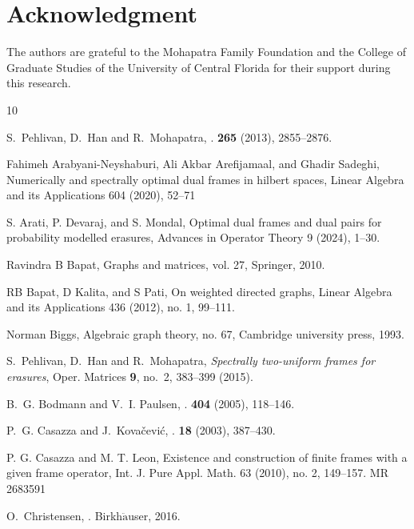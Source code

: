 \documentclass[final,1p,times]{elsarticle}
\begin{document}
\section{Acknowledgment}
	 The authors are grateful to the Mohapatra Family Foundation and the College of Graduate Studies of the University of Central Florida for their support during this research.
	



\begin{thebibliography}{10}

S.~Pehlivan, D.~Han and R.~Mohapatra,
.
 \textbf{265} (2013), 2855--2876.

Fahimeh Arabyani-Neyshaburi, Ali Akbar Arefijamaal, and Ghadir Sadeghi, Numerically and spectrally optimal
dual frames in hilbert spaces, Linear Algebra and its Applications 604 (2020), 52–71

S. Arati, P. Devaraj, and S. Mondal, Optimal dual frames and dual pairs for probability modelled erasures,
Advances in Operator Theory 9 (2024), 1–30.

Ravindra B Bapat, Graphs and matrices, vol. 27, Springer, 2010.

RB Bapat, D Kalita, and S Pati, On weighted directed graphs, Linear Algebra and its Applications 436 (2012), no. 1, 99–111.


Norman Biggs, Algebraic graph theory, no. 67, Cambridge university press, 1993.

S.~Pehlivan, D.~Han and R.~Mohapatra, \emph{Spectrally two-uniform
  frames for erasures}, Oper. Matrices \textbf{9}, no.~2, 383--399 (2015).


B.~G. Bodmann and V.~I. Paulsen,
.
 \textbf{404} (2005), 118--146.

P.~G. Casazza and J.~Kova{\v{c}}evi{\'c},
.
 \textbf{18} (2003), 387--430.


P. G. Casazza and M. T. Leon, Existence and construction of finite frames with a given frame operator, Int. J. Pure Appl. Math. 63 (2010), no. 2, 149–157. MR 2683591


O.~Christensen,
.
\newblock Birkh$\ddot{\text{a}}$user, 2016.


\end{thebibliography}
\end{document}
